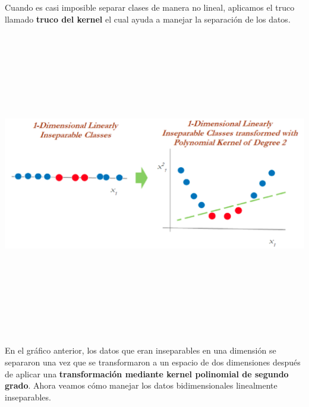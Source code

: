 \documentclass[
]{book}
\begin{document}
Cuando es casi imposible separar clases de manera no lineal, aplicamos el truco llamado \textbf{truco del kernel} el cual ayuda a manejar la separación de los datos.

\begin{center}\includegraphics[width=900pt,height=380pt]{img/03-svm/04_polinomial_kernel_plot} \end{center}

En el gráfico anterior, los datos que eran inseparables en una dimensión se separaron una vez que se transformaron a un espacio de dos dimensiones después de aplicar una \textbf{transformación mediante kernel polinomial de segundo grado}. Ahora veamos cómo manejar los datos bidimensionales linealmente inseparables.
\end{document}
